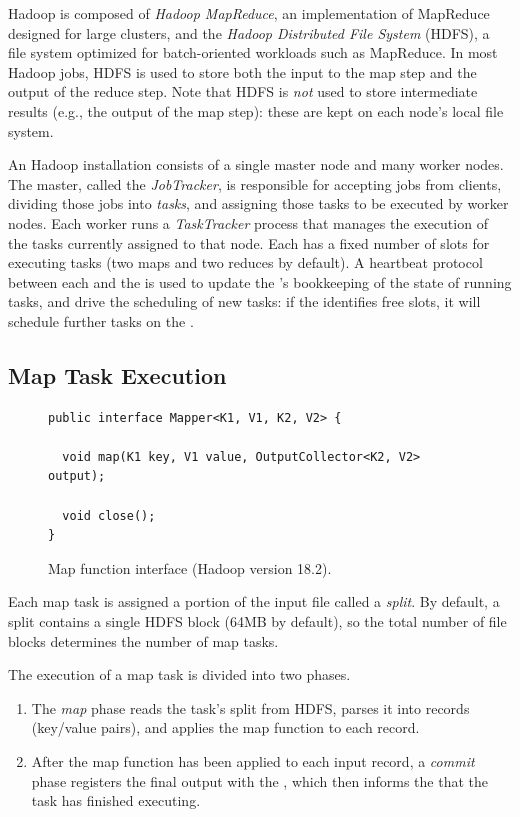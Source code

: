 Hadoop is composed of {\em Hadoop MapReduce}, an implementation of MapReduce
designed for large clusters, and the {\em Hadoop Distributed File System}
(HDFS), a file system optimized for batch-oriented workloads such as MapReduce.
In most Hadoop jobs, HDFS is used to store both the input to the map step and
the output of the reduce step.  Note that HDFS is {\em not} used to store
intermediate results (e.g., the output of the map step): these are kept on each
node's local file system.

An Hadoop installation consists of a single master node and many worker nodes.
The master, called the {\em JobTracker}, is responsible for accepting jobs
from clients, dividing those jobs into {\em tasks}, and assigning those tasks
to be executed by worker nodes.  Each worker runs a {\em TaskTracker} process
that manages the execution of the tasks currently assigned to that node.  Each
{\TT} has a fixed number of slots for executing tasks (two maps and two reduces
by default).  A heartbeat protocol between each {\TT} and the {\JT} is used to
update the {\JT}'s bookkeeping of the state of running tasks, and drive the
scheduling of new tasks: if the \JT identifies free {\TT} slots, it will
schedule further tasks on the {\TT}.

\subsection{Map Task Execution}
\label{ch:hadoop:sec:maptask}

\begin{figure}[t]
\ssp
\begin{minipage}{\linewidth}
\centering
\begin{verbatim}
public interface Mapper<K1, V1, K2, V2> {
  
  void map(K1 key, V1 value, OutputCollector<K2, V2> output);

  void close();
}
\end{verbatim}
\end{minipage}
\caption{Map function interface (Hadoop version 18.2).}
\label{fig:mapfunction}
\end{figure}

Each map task is assigned a portion of the input file called a {\em split}.
By default, a split contains a single HDFS block (64MB by default), so the
total number of file blocks determines the number of map tasks.

The execution of a map task is divided into two phases.
\begin{enumerate}
    \ssp
\item
  The {\em map} phase reads the task's split from HDFS, parses it into
  records (key/value pairs), and applies the map function to each
  record.
\item
  After the map function has been applied to each input record, a
  {\em commit} phase registers the final output with the {\TT}, which
  then informs the {\JT} that the task has finished executing.
\end{enumerate}

